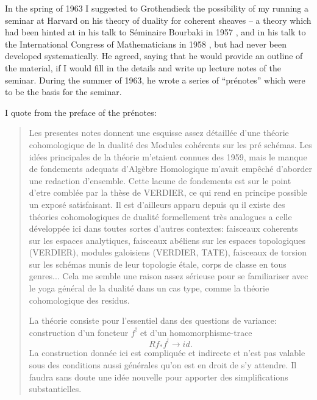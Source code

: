 %
%

\preface

In the spring of 1963 I suggested to Grothendieck the possibility of my running a seminar at Harvard on his theory of duality for coherent sheaves -- a theory which had been hinted at in his talk to S\'eminaire Bourbaki in 1957 \cite{g1957}, and in his talk to the International Congress of Mathematicians in 1958 \cite{g1958}, but had never been developed systematically. He agreed, saying that he would provide an outline of the material, if I would fill in the details and write up lecture notes of the seminar. During the summer of 1963, he wrote a series of ``pr\'enotes'' which were to be the basis for the seminar.\par
I quote from the preface of the pr\'enotes:
\begin{quote}
    Les presentes notes donnent une esquisse assez d\'{e}taill\'{e}e d'une th\'{e}orie cohomologique de la dualit\'{e} des Modules coh\'{e}rents sur les pr\'{e} sch\'{e}mas. Les id\'{e}es principales de la th\'{e}orie m'etaient connues des 1959, mais le manque de fondements adequats d'Alg\`{e}bre Homologique m'avait emp\^{e}ch\'{e} d'aborder une redaction d'ensemble. Cette lacune de fondements est sur le point d'etre combl\'{e}e par la th\`{e}se de VERDIER, ce qui rend en principe possible un expos\'{e} satisfaisant. Il est d'ailleurs apparu depuis qu il existe des th\'{e}ories cohomologiques de dualit\'{e} formellement tr\`{e}s analogues a celle d\'{e}velopp\'{e}e ici dans toutes sortes d'autres contextes: faisceaux coherents sur les espaces analytiques, faisceaux ab\'{e}liens sur les espaces topologiques (VERDIER), modules galoisiens (VERDIER, TATE), faisceaux de torsion sur les sch\'{e}mas munis de leur topologie \'{e}tale, corps de classe en tous genres... Cela me semble une raison assez s\'{e}rieuse pour se familiariser avec le yoga g\'{e}n\'{e}ral de la dualit\'{e} dans un cas type, comme la th\'{e}orie cohomologique des residus.\par
    La th\'{e}orie consiste pour l'essentiel dans des questions de variance: construction d'un foncteur $f^{!}$ et d'un homomorphisme-trace \[Rf_{\ast}f^{!}\rightarrow id.\] La construction donn\'{e}e ici est compliqu\'{e}e et indirecte et n'est pas valable sous des conditions aussi g\'{e}n\'{e}rales qu'on est en droit de s'y attendre. Il faudra sans doute une id\'{e}e nouvelle pour apporter des simplifications substantielles.
\end{quote}

